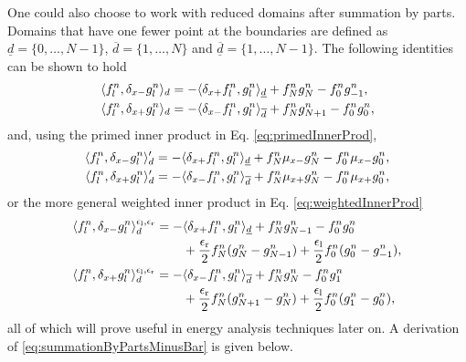 One could also choose to work with reduced domains after summation by parts. Domains that have one fewer point at the boundaries are defined as $\underline{d} = \{0, \hdots, N-1\}$, 
$\overline{d} = \{1, \hdots, N\}$ and $\underline{\overline{d}} = \{1, \hdots, N-1\}$. The following identities can be shown to hold
\begin{subequations}\label{eq:summationByParts}
    \begin{align}
        \langle f_l^n, \delta_{x-} g_l^n \rangle_d  &= -\langle \delta_{x+} f_l^n, g_l^n\rangle_{\underline{d}} + f_N^ng_N^n - f_0^ng_{-1}^n,\label{eq:summationByPartsMinusBar}\\
        \langle f_l^n, \delta_{x+} g_l^n \rangle_d 
        &= -\langle \delta_{x-} f_l^n, g_l^n\rangle_{\overline{d}} + f_N^ng_{N+1}^n - f_0^ng_0^n,\label{eq:summationByPartsPlusBar}
    \end{align}
\end{subequations}
and, using the primed inner product in Eq. \eqref{eq:primedInnerProd},
\begin{subequations}
    \begin{align}
        \langle f_l^n, \delta_{x-} g_l^n \rangle_d'  = -\langle \delta_{x+} f_l^n, g_l^n \rangle_{\underline{d}}+f_N^n\mu_{x-} g_N^n-f_0^n\mu_{x-} g_0^n,\label{eq:primedIdentityMinus}\\
        \langle f_l^n, \delta_{x+} g_l^n \rangle_d'  = -\langle \delta_{x-} f_l^n, g_l^n \rangle_{\overline{d}}+f_N^n\mu_{x+} g_N^n-f_0^n\mu_{x+} g_0^n,\label{eq:primedIdentityPlus}
    \end{align}
\end{subequations}
%
or the more general weighted inner product in Eq. \eqref{eq:weightedInnerProd}
\begin{subequations}
    \begin{align}
       &\begin{aligned}
        \langle f_l^n, \delta_{x-} g_l^n \rangle_d^{\epsilon_\text{l},\epsilon_\text{r}}  = -&\langle \delta_{x+} f_l^n, g_l^n \rangle_{\underline{d}}+ f_N^ng_{N-1}^n - f_0^ng_0^n \\
        &+ \frac{\epsilon_\text{r}}{2}f_N^n(g_N^n-g_{N-1}^n)+ \frac{\epsilon_\text{l}}{2}f_0^n(g_0^n - g_{-1}^n),
        \end{aligned}\label{eq:weightedIdentityMinus}\\
        &\begin{aligned}
            \langle f_l^n, \delta_{x+} g_l^n \rangle_d^{\epsilon_\text{l},\epsilon_\text{r}}  = -&\langle \delta_{x-} f_l^n, g_l^n \rangle_{\overline{d}}+ f_N^ng_N^n - f_0^ng_1^n  \\
            &+ \frac{\epsilon_\text{r}}{2}f_N^n(g_{N+1}^n-g_N^n)+ \frac{\epsilon_\text{l}}{2}f_0^n(g_1^n - g_0^n),
        \end{aligned}\label{eq:weightedIdentityPlus}
    \end{align}
\end{subequations}
all of which will prove useful in energy analysis techniques later on. A derivation of \eqref{eq:summationByPartsMinusBar} is given below. 

